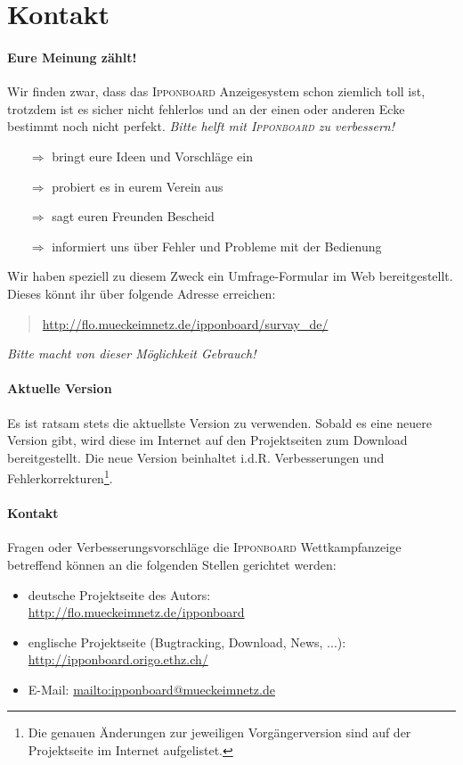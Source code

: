 ﻿\documentclass[11pt,numbers=noenddot]{scrreprt}
\newcommand*{\IB}{\begingroup{\fontspec{Cuprum}\selectfont\textsc{Ipponboard}} \endgroup}
\begin{document}
\newpage
\section{Kontakt}
\paragraph{Eure Meinung zählt!}
Wir finden zwar, dass das \IB Anzeigesystem schon ziemlich toll ist, trotzdem ist es sicher nicht fehlerlos und an der einen oder anderen Ecke bestimmt noch nicht perfekt. \textit{Bitte helft mit \IB zu verbessern!}

\begin{itemize}
	\item[$\Rightarrow$] bringt eure Ideen und Vorschläge ein
	\item[$\Rightarrow$] probiert es in eurem Verein aus
	\item[$\Rightarrow$] sagt euren Freunden Bescheid
	\item[$\Rightarrow$] informiert uns über Fehler und Probleme mit der Bedienung
\end{itemize}
Wir haben speziell zu diesem Zweck ein Umfrage-Formular im Web bereitgestellt. Dieses könnt ihr über folgende Adresse erreichen:
\begin{quote}
	\url{http://flo.mueckeimnetz.de/ipponboard/survay_de/}
\end{quote}
{\parindent 0pt\textit{Bitte macht von dieser Möglichkeit Gebrauch!}}

\paragraph{Aktuelle Version}
Es ist ratsam stets die aktuellste Version zu verwenden. Sobald es eine neuere Version gibt, wird diese im Internet auf den Projektseiten zum Download bereitgestellt. Die neue Version beinhaltet i.d.R. Verbesserungen und Fehlerkorrekturen\footnote{Die genauen Änderungen zur jeweiligen Vorgängerversion sind auf der Projektseite im Internet aufgelistet.}. 

\paragraph{Kontakt}
Fragen oder Verbesserungsvorschläge die \IB Wettkampfanzeige betreffend können an die folgenden Stellen gerichtet werden:
\begin{itemize}
	\item deutsche Projektseite des Autors:\\\url{http://flo.mueckeimnetz.de/ipponboard}
	\item englische Projektseite (Bugtracking, Download, News, ...):\\\url{http://ipponboard.origo.ethz.ch/}
	\item E-Mail: \url{mailto:ipponboard@mueckeimnetz.de}
\end{itemize}
\end{document}
